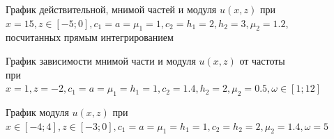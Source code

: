 \documentclass[a4paper, 12pt]{article}
\begin{document}
\begin{figure}[h!]
\noindent{}
\caption{График действительной, мнимой частей и модуля $u(x,z)$ при $x=15, z \in [-5;0], c_1=a=\mu_1=1, c_2=h_1=2, h_2=3, \mu_2=1.2$, посчитанных прямым интегрированием}
\label{figCurves}
\end{figure}

\begin{figure}[h!]
\noindent{}
            \caption{График зависимости мнимой части и модуля $u(x,z)$ от частоты при $x=1, z=-2, c_1=a=\mu_1=h_1=1, c_2=1.4, h_2=2, \mu_2=0.5, \omega \in [1;12]$}
            \label{figCurves}
            \end{figure}  
            
            \begin{figure}[h!]
                \noindent{}
                \caption{График модуля $u(x,z)$ при $x \in [-4;4], z \in [-3;0], c_1=a=\mu_1=h_1=1, c_2=h_2=2, \mu_2=1.4, \omega =5$}
                \label{figCurves}
                \end{figure}
\end{document}
